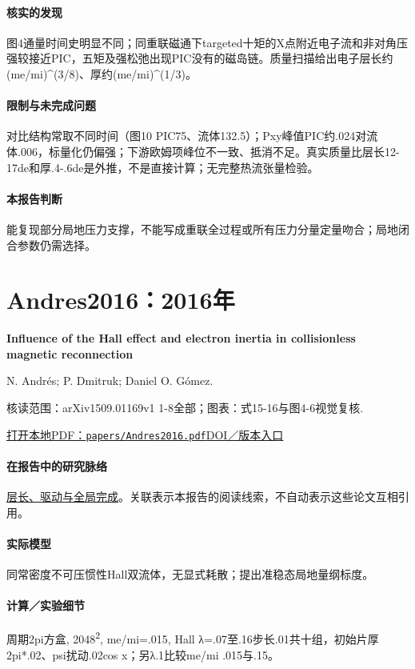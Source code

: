 \documentclass[UTF8,a4paper,11pt,openany,fontset=fandol]{ctexbook}
\begin{document}
\paragraph{核实的发现}图4通量时间史明显不同；同重联磁通下targeted十矩的X点附近电子流和非对角压强较接近PIC，五矩及强松弛出现PIC没有的磁岛链。质量扫描给出电子层长约(me/mi)\textasciicircum{}(3/8)、厚约(me/mi)\textasciicircum{}(1/3)。

\paragraph{限制与未完成问题}对比结构常取不同时间（图10 PIC75、流体132.5）；Pxy峰值PIC约.024对流体.006，标量化仍偏强；下游欧姆项峰位不一致、抵消不足。真实质量比层长12-17de和厚.4-.6de是外推，不是直接计算；无完整热流张量检验。

\paragraph{本报告判断}能复现部分局地压力支撑，不能写成重联全过程或所有压力分量定量吻合；局地闭合参数仍需选择。

\section{Andres2016：2016年}\label{paper:Andres2016}

\textbf{Influence of the Hall effect and electron inertia in collisionless magnetic reconnection}\citep{Andres2016}\

N. Andrés;  P. Dmitruk;  Daniel O. Gómez.

\textsf{核读范围：}arXiv1509.01169v1 1-8全部；\textsf{图表：}式15-16与图4-6视觉复核.

\href{run:../papers/Andres2016.pdf}{打开本地PDF：\texttt{papers/Andres2016.pdf}}\quad\href{https://doi.org/10.1063/1.4942418}{DOI／版本入口}

\paragraph{在报告中的研究脉络}\hyperref[story:global]{层长、驱动与全局完成}。关联表示本报告的阅读线索，不自动表示这些论文互相引用。

\paragraph{实际模型}同常密度不可压惯性Hall双流体，无显式耗散；提出准稳态局地量纲标度。

\paragraph{计算／实验细节}周期2pi方盒, 2048\textsuperscript{2}, me/mi=.015, Hall λ=.07至.16步长.01共十组，初始片厚2pi*.02、psi扰动.02cos x；另λ.1比较me/mi .015与.15。
\end{document}
